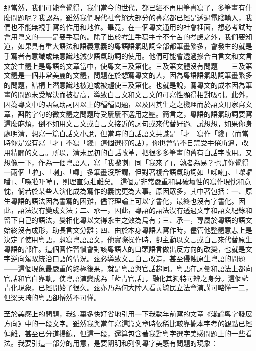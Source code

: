 \documentclass[a5paper, 12pt, openany]{book} %
\begin{document}
那當然，我們可能會覺得，我們當今的世代，都已經不再用筆書寫了，多筆畫有什麼問題呢？我認為，雖然我們現代社會絕大部分的書寫都已經是透過電腦輸入，我們也不能無視手寫的作用和地位。畢竟，在一個粵文通用的社會裡面，想必考試時會用粵文的——是要手寫的。除了出於考生手寫字辛不辛苦的考慮之外，我們要知道，如果具有重大語法和語義意義的粵語語氣助詞全部都筆畫繁多，會發生的就是手寫者有意識或無意識地減少語氣助詞的使用。他們可能會透過摻合白言文和文言文於主體上是粵語的文章當中，使粵文三及第化。三及第文體沒有問題——三及第文體是一個非常美麗的文體，問題在於想寫粵文的人，因為粵語語氣助詞筆畫繁多的問題，結構上潛意識地被迫或被趨使三及第化。也就是說，寫粵文的成本因為筆畫的問題未受解決而被提高，導致白言文和文言文的可寫性顯得相對吸引。此外，因為粵文中的語氣助詞因以上的種種問題，以及因其生之之機理而於語文用家寫文章，斟酌字句的微文體之問題時受屢屢不選用之壓。簡言之，粵語的語氣助詞要寫這麼麻煩，倒不如用文言文或白言文接近的詞句或來代替好過。試想想，如果你身處明清，想寫一篇白話文小說，但當時的白話語文共識是「才」寫作「纔」（而當時你是沒有寫「才」不寫「纔」這個選擇的話），你也會情不自禁受手倦所逼，改用精闢的文言。所以，清末民初的白話改革，把很多多筆畫的舊有白話字改用。又想像一下，作為一個粵語人，寫「我嚟喇」同「我來了」，孰者為易？也許你覺得一兩個「啦」、「喇」、「囉」多筆畫沒所謂，但對著複合語氣助詞如「㗎喇」、「㗎囉噃」、「㗎啦吓嘩」，則理直氣壯難矣。
這個是非常嚴重和具破壞性的寫作現忱和意忱，倘若於某些人演化成為寫作的義忱更為大事。原因眾多，其中著包括：一、原生粵語的語法因為書寫的困難，儘管理論上可以字書化，最終也沒有字書化。因此，語法沒有變成文法；二、承一，因此，粵語的語法沒有透過文字和語文紀錄和留下自己的語法，變相化粵以文得永生之效為烏有；三、承一，專屬於粵語的語文始終沒有成形，助長言文分離；四、由於本身粵語人寫作時，儘管他整體意志上是決定了使用粵語，想寫粵語語文，他實際操作時，卻主動以文言或白言來代替原生粵語的部件。這個寫作習慣會對該粵語人的口頭語言做出反方向的改變，也就是文字逆向駕馭統治口語的情況。茲必導致文言白言改造，甚至侵蝕原生粵語的問題——這個現象最嚴重的終極後果，就是粵語與官話趨同。粵語在詞彙和語法上都向官話和官白靠軌，使粵語演變成為「藍青官話」，融化其獨特可辨之身分。這個藍青化現象，已經開始了很久。茲亦乃為何大陸人看黃毓民立法會演講可略懂一二，但梁天琦的粵語卻懵然不可懂。

至於美感上的問題，我這裏多快好省地引用一下我數年前寫的文章《淺論粵字發展方向》中的一段文字。雖然我與當年寫這篇文章時依稀比較靠攏本字考的觀點已經偏離，甚至已分道揚鑣，但這一段，還算包含著我對粵字選字美感問題上的一些看法。我要引這一部分的用意，是要闡明和列例粵字美感有問題的現象：
\end{document}

